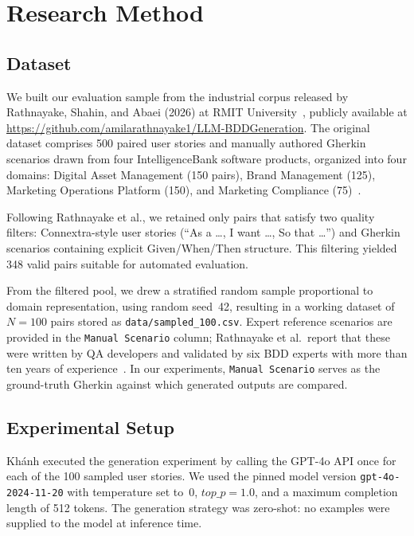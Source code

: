 \section{Research Method}
\label{sec:method}

\subsection{Dataset}
\label{sec:method-dataset}

We built our evaluation sample from the industrial corpus released by Rathnayake, Shahin, and Abaei (2026) at RMIT University~\cite{rathnayake2026llm}, publicly available at \url{https://github.com/amilarathnayake1/LLM-BDDGeneration}.
The original dataset comprises 500 paired user stories and manually authored Gherkin scenarios drawn from four IntelligenceBank software products, organized into four domains: Digital Asset Management (150 pairs), Brand Management (125), Marketing Operations Platform (150), and Marketing Compliance (75)~\cite{rathnayake2026llm}.

Following Rathnayake et al., we retained only pairs that satisfy two quality filters: Connextra-style user stories (``As a \ldots, I want \ldots, So that \ldots'') and Gherkin scenarios containing explicit Given/When/Then structure.
This filtering yielded 348 valid pairs suitable for automated evaluation.

From the filtered pool, we drew a stratified random sample proportional to domain representation, using random seed~42, resulting in a working dataset of $N{=}100$ pairs stored as \texttt{data/sampled\_100.csv}.
Expert reference scenarios are provided in the \texttt{Manual Scenario} column; Rathnayake et al.\ report that these were written by QA developers and validated by six BDD experts with more than ten years of experience~\cite{rathnayake2026llm}.
In our experiments, \texttt{Manual Scenario} serves as the ground-truth Gherkin against which generated outputs are compared.

\subsection{Experimental Setup}
\label{sec:experimental-setup}

Khánh executed the generation experiment by calling the GPT-4o API once for each of the 100 sampled user stories.
We used the pinned model version \texttt{gpt-4o-2024-11-20} with temperature set to~0, $top\_p{=}1.0$, and a maximum completion length of 512 tokens.
The generation strategy was zero-shot: no examples were supplied to the model at inference time.


